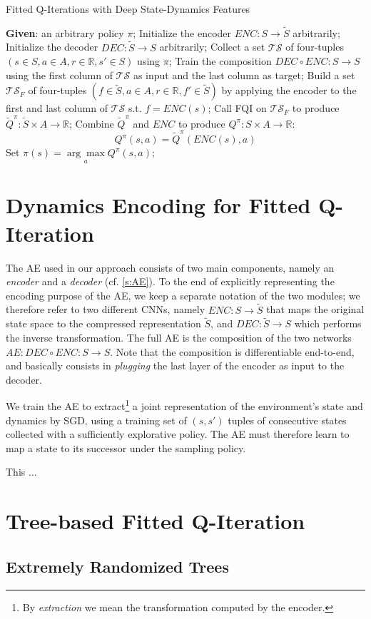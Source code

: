 \begin{algorithm}[h]
    \caption{Fitted Q-Iterations with Deep State-Dynamics Features}
    \label{alg:FQI-DSDF}
    \begin{algorithmic}
	\STATE \textbf{Given}: an arbitrary policy $\pi$;
	\STATE Initialize the encoder $ENC: S \rightarrow \tilde{S}$ arbitrarily;
	\STATE Initialize the decoder $DEC: \tilde{S} \rightarrow S$ arbitrarily;
	\REPEAT 
	    \STATE Collect a set $\mathcal{TS}$ of four-tuples $(s \in S, a \in A, r \in \mathbb{R}, s' \in S)$ using $\pi$;
	    \STATE Train the composition $DEC \circ ENC: S \rightarrow S$ using the first column of $\mathcal{TS}$ as input and the last column as target;
	    \STATE Build a set $\mathcal{TS}_F$ of four-tuples $(f \in \tilde{S}, a \in A, r \in \mathbb{R}, f' \in \tilde{S})$ by applying the encoder to the first and last column of $\mathcal{TS}$ s.t. $f = ENC(s)$;
	    \STATE Call FQI on $\mathcal{TS}_F$ to produce $\tilde{Q}^\pi: \tilde{S} \times A \rightarrow \mathbb{R}$;
	    \STATE Combine $\tilde{Q}^\pi$ and $ENC$ to produce $Q^\pi: S \times A \rightarrow \mathbb{R}$:
		\[
		Q^\pi(s, a) = \tilde{Q}^\pi(ENC(s), a)
		\]
	    \STATE Set $\pi(s) = \underset{a}{\arg\max} Q^{\pi}(s, a)$;
    \end{algorithmic}
\end{algorithm}
%
\section{Dynamics Encoding for Fitted Q-Iteration}
The AE used in our approach consists of two main components, namely an 
\textit{encoder} and a \textit{decoder} (cf. \ref{s:AE}). To the end of 
explicitly representing the encoding purpose of the AE, we keep a separate 
notation of the two modules; we therefore refer to two different CNNs, namely 
$ENC: S \rightarrow \tilde{S}$ that maps the original state space to the 
compressed representation $\tilde{S}$, and $DEC: \tilde{S} \rightarrow S$ which
performs the inverse transformation. The full AE is the composition of the two 
networks $AE: DEC \circ ENC: S \rightarrow S$. Note that the composition is 
differentiable end-to-end, and basically consists in \textit{plugging} the last
layer of the encoder as input to the decoder. 

We train the AE to extract\footnote{By \textit{extraction} we mean the 
transformation computed by the encoder.} a joint representation of the 
environment's state and dynamics by SGD, using a training set of $(s, s')$ 
tuples of consecutive states collected with a sufficiently explorative policy. 
The AE must therefore learn to map a state to its successor under the sampling 
policy. 

This ...


\section{Tree-based Fitted Q-Iteration}
\subsection{Extremely Randomized Trees}